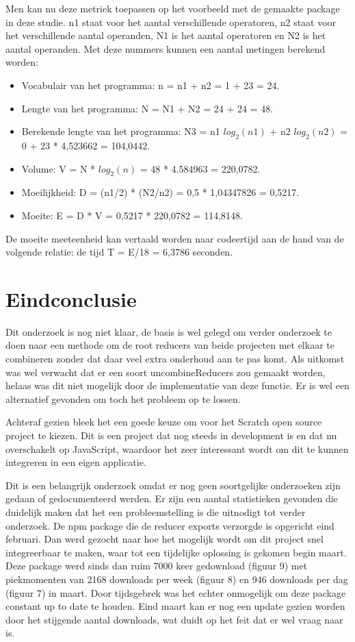 Men kan nu deze metriek toepassen op het voorbeeld met de gemaakte package in deze studie. n1 staat voor het aantal verschillende operatoren, n2 staat voor het verschillende aantal operanden, N1 is het aantal operatoren en N2 is het aantal operanden. Met deze nummers kunnen een aantal metingen berekend worden:
\begin{itemize}
	\item Vocabulair van het programma: n = n1 + n2 = 1 + 23 = 24.
	\item Lengte van het programma: N = N1 + N2 = 24 + 24 = 48.
	\item Berekende lengte van het programma: N3 = n1 $log_{2}(n1)$ + n2 $log_{2}(n2)$ = 0 + 23 * 4,523662 = 104,0442.
	\item Volume: V = N * $log_{2}(n)$ = 48 * 4.584963 = 220,0782.
	\item Moeilijkheid: D = (n1/2) * (N2/n2) = 0,5 * 1,04347826 = 0,5217.
	\item Moeite: E = D * V = 0,5217 * 220,0782 = 114,8148.
\end{itemize}
De moeite meeteenheid kan vertaald worden naar codeertijd aan de hand van de volgende relatie: de tijd T = E/18 = 6,3786 seconden.




\section{Eindconclusie}
Dit onderzoek is nog niet klaar, de basis is wel gelegd om verder onderzoek te doen naar een methode om de root reducers van beide projecten met elkaar te combineren zonder dat daar veel extra onderhoud aan te pas komt. Als uitkomst was wel verwacht dat er een soort uncombineReducers zou gemaakt worden, helaas was dit niet mogelijk door de implementatie van deze functie. Er is wel een alternatief gevonden om toch het probleem op te lossen. 

Achteraf gezien bleek het een goede keuze om voor het Scratch open source project te kiezen. Dit is een project dat nog steeds in development is en dat nu overschakelt op JavaScript, waardoor het zeer interessant wordt om dit te kunnen integreren in een eigen applicatie. 

Dit is een belangrijk onderzoek omdat er nog geen soortgelijke onderzoeken zijn gedaan of gedocumenteerd werden.
Er zijn een aantal statistieken gevonden die duidelijk maken dat het een probleemstelling is die uitnodigt tot verder onderzoek. De npm package die de reducer exports verzorgde is opgericht eind februari. Dan werd gezocht naar hoe het mogelijk wordt om dit project snel integreerbaar te maken, waar tot een tijdelijke oplossing is gekomen begin maart. Deze package werd sinds dan ruim 7000 keer gedownload (figuur 9) met piekmomenten van 2168 downloads per week (figuur 8) en 946 downloads per dag (figuur 7) in maart. Door tijdsgebrek was het echter onmogelijk om deze package constant up to date te houden. Eind maart kan er nog een update gezien worden door het stijgende aantal downloads, wat duidt op het feit dat er wel vraag naar is.